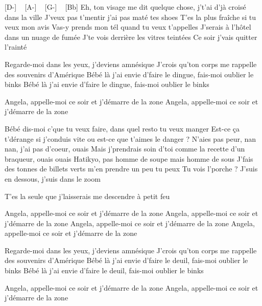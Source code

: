 [D-] ~ [A-] ~ [G-] ~ [Bb]
Eh, ton visage me dit quelque chose, j't'ai d'jà croisé dans la ville
J'veux pas t'mentir j'ai pas maté tes shoes
T'es la plus fraîche si tu veux mon avis
Vas-y prends mon tél quand tu veux t'appelles
J'serais à l'hôtel dans un nuage de fumée
J'te vois derrière les vitres teintées
Ce soir j'vais quitter l'rainté

Regarde-moi dans les yeux, j'deviens amnésique
J'crois qu'ton corps me rappelle des souvenirs d'Amérique
Bébé là j'ai envie d'faire le dingue, fais-moi oublier le binks
Bébé là j'ai envie d'faire le dingue, fais-moi oublier le binks

Angela, appelle-moi ce soir et j'démarre de la zone
Angela, appelle-moi ce soir et j'démarre de la zone

Bébé dis-moi c'que tu veux faire, dans quel resto tu veux manger
Est-ce ça t'dérange si j'conduis vite ou est-ce que t'aimes le danger ?
N'aies pas peur, nan nan, j'ai pas d'coeur, ouais
Mais j'prendrais soin d'toi comme la recette d'un braqueur, ouais ouais
Hatikyo, pas homme de soupe mais homme de sous
J'fais des tonnes de billets verts m'en prendre un peu tu peux
Tu vois l'porche ? J'suis en dessous, j'suis dans le zoom

T'es la seule que j'laisserais me descendre à petit feu

Angela, appelle-moi ce soir et j'démarre de la zone
Angela, appelle-moi ce soir et j'démarre de la zone
Angela, appelle-moi ce soir et j'démarre de la zone
Angela, appelle-moi ce soir et j'démarre de la zone

Regarde-moi dans les yeux, j'deviens amnésique
J'crois qu'ton corps me rappelle des souvenirs d'Amérique
Bébé là j'ai envie d'faire le deuil, fais-moi oublier le binks
Bébé là j'ai envie d'faire le deuil, fais-moi oublier le binks


Angela, appelle-moi ce soir et j'démarre de la zone
Angela, appelle-moi ce soir et j'démarre de la zone
